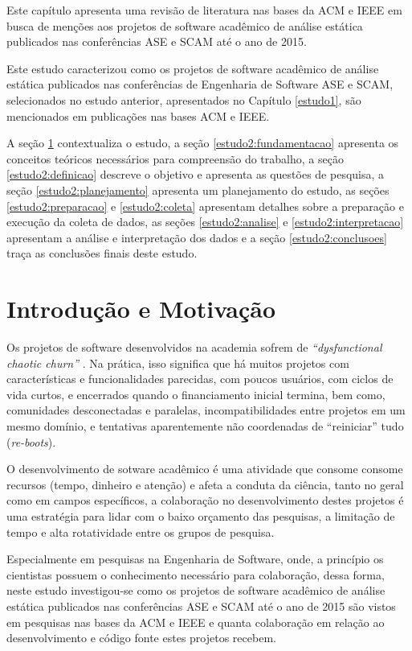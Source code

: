 {Este capítulo apresenta uma revisão de literatura nas bases da ACM e IEEE em
busca de menções aos projetos de software acadêmico de análise estática
publicados nas conferências ASE e SCAM até o ano de 2015.}
\label{estudo2}

Este estudo caracterizou como os projetos de software acadêmico de análise
estática publicados nas conferências de Engenharia de Software ASE e SCAM,
selecionados no estudo anterior, apresentados no Capítulo \ref{estudo1}, são
mencionados em publicações nas bases ACM e IEEE.

A seção \ref{estudo2:introducao} contextualiza o estudo,
a seção \ref{estudo2:fundamentacao} apresenta os conceitos teóricos necessários para compreensão do trabalho,
a seção \ref{estudo2:definicao} descreve o objetivo e apresenta as questões de pesquisa,
a seção \ref{estudo2:planejamento} apresenta um planejamento do estudo,
as seções \ref{estudo2:preparacao} e \ref{estudo2:coleta} apresentam detalhes sobre a preparação e execução da coleta de dados,
as seções \ref{estudo2:analise} e \ref{estudo2:interpretacao} apresentam a análise e interpretação dos dados e
a seção \ref{estudo2:conclusoes} traça as conclusões finais deste estudo.

\section{Introdução e Motivação} \label{estudo2:introducao} %

Os projetos de software desenvolvidos na academia sofrem de {\it
``dysfunctional chaotic churn''} \cite{howison2015understanding}.
Na prática, isso significa que há muitos projetos com características e
funcionalidades parecidas, com poucos usuários, com ciclos de vida curtos, e
encerrados quando o financiamento inicial termina, bem como, comunidades
desconectadas e paralelas, incompatibilidades entre projetos em um mesmo
domínio, e tentativas aparentemente não coordenadas de ``reiniciar'' tudo ({\it re-boots}). 

O desenvolvimento de sotware acadêmico é uma atividade que consome consome
recursos (tempo, dinheiro e atenção) e afeta a conduta da ciência, tanto no
geral como em campos específicos, a colaboração no desenvolvimento destes
projetos é uma estratégia para lidar com o baixo orçamento das pesquisas, a
limitação de tempo e alta rotatividade entre os grupos de pesquisa.

Especialmente em pesquisas na Engenharia de Software, onde, a princípio os
cientistas possuem o conhecimento necessário para colaboração, dessa forma,
neste estudo investigou-se como os projetos de software acadêmico de análise
estática publicados nas conferências ASE e SCAM até o ano de 2015 são vistos em
pesquisas nas bases da ACM e IEEE e quanta colaboração em relação ao
desenvolvimento e código fonte estes projetos recebem.

